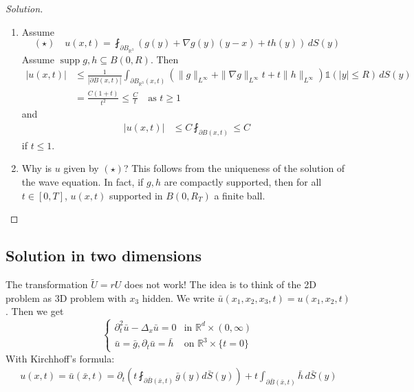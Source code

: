 \documentclass{report}
\theoremstyle{tommy}
\newcommand{\supp}{\operatorname{supp}}
\begin{document}
  \begin{proof}[Solution]\
    \begin{enumerate}[label=Step \arabic*:]
      \item Assume 
      \[(\star) \quad u(x,t) = \fint_{\partial B_{\mathbb{R}^3}} \left(g(y) + \nabla g(y)(y-x) + t h(y)\right)\, dS(y)\]
      Assume \(\supp g,h \subseteq B(0,R)\). Then 
      \begin{align*}
        |u(x,t)| &\le \frac{1}{|\partial B(x,t)|} \int_{\partial B_{\mathbb{R}^3}(x,t)} \left(\|g\|_{L^\infty} + \|\nabla g\|_{L^\infty} t + t \|h\|_{L^\infty}\right) \mathbb{1}(|y| \le R) \, dS(y) \\
        &= \frac{C(1+t)}{t^2} \le \frac{C}{t} \quad \text{as } t \ge 1
      \end{align*}
      and
      \begin{align*}
        |u(x,t)| &\le C \fint_{\partial B(x,t)} \le C
      \end{align*}
      if \(t \le 1\).
      \item Why is \(u\) given by \((\star)\)? This follows from the uniqueness of the solution of the wave equation. In fact, if \(g, h\) are compactly supported, then for all \(t \in [0,T]\), \(u(x,t)\) supported in \(B(0, R_T)\) a finite ball.
    \end{enumerate}
  \end{proof}

  \subsection{Solution in two dimensions}
  
  The transformation \(\tilde U = r U\) does not work! The idea is to think of the 2D problem as 3D problem with \(x_3\) hidden. We write \(\bar u(x_1, x_2, x_3, t) = u(x_1, x_2, t)\). Then we get 
  \[\begin{cases}
    \partial_t^2 \bar u - \Delta_x \bar u = 0 &\text{in } \mathbb{R}^d \times (0,\infty) \\
    \bar u = \bar g, \partial_t \bar u = \bar h &\text{on } \mathbb{R}^3 \times \{t=0\}
  \end{cases}\]
  With Kirchhoff's formula:
  \begin{align*}
    u(x,t) = \bar u(\bar x,t) = \partial_t \left(t \fint_{\partial \bar B(\bar x, t)} \bar g(y) d \bar S(y)\right) + t \int_{\partial \bar B(\bar x, t)} \bar h \, d\bar S(y)
  \end{align*}
\end{document}
